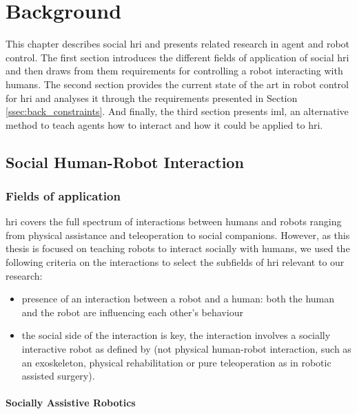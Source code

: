 \chapter{Background} \label{chap:background}
\glsresetall

This chapter describes social \gls{hri} and presents related research in agent and robot control. The first section introduces the different fields of application of social \gls{hri} and then draws from them requirements for controlling a robot interacting with humans. The second section provides the current state of the art in robot control for \gls{hri} and analyses it through the requirements presented in Section \ref{ssec:back_constraints}. And finally, the third section presents \gls{iml}, an alternative method to teach agents how to interact and how it could be applied to \gls{hri}.

\section{Social Human-Robot Interaction}

\subsection{Fields of application}

\gls{hri} covers the full spectrum of interactions between humans and robots ranging from physical assistance and teleoperation to social companions. However, as this thesis is focused on teaching robots to interact socially with humans, we used the following criteria on the interactions to select the subfields of \gls{hri} relevant to our research:
\begin{itemize}
\item presence of an interaction between a robot and a human: both the human and the robot are influencing each other's behaviour
\item the social side of the interaction is key, the interaction involves a socially interactive robot as defined by \citet{Fong2003} (not physical human-robot interaction, such as an exoskeleton, physical rehabilitation or pure teleoperation as in robotic assisted surgery).
\end{itemize}

\subsubsection{Socially Assistive Robotics}

